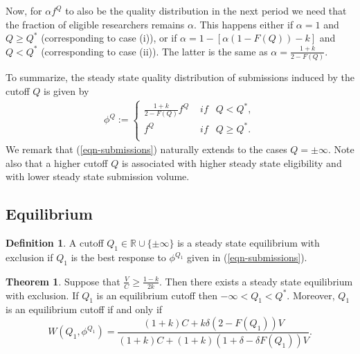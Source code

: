 \documentclass[12pt]{article}
\theoremstyle{plain}
\theoremstyle{definition}
\newtheorem{theorem}{Theorem}
\newtheorem{definition}{Definition}
\theoremstyle{remark}
\def\RR{\mathbb{R}}
\begin{document}
Now, for $\alpha f^Q$ to also be the quality distribution in the next period we need that the fraction of eligible researchers remains $\alpha$. This happens either if $\alpha=1$ and $Q\ge Q^*$ (corresponding to case (i)), or if $\alpha=1-[\alpha(1-F(Q))- k]$ and $Q< Q^*$ (corresponding to case (ii)). The latter is the same as $\alpha=\frac{1+k}{2-F(Q)}$.

To summarize, the steady state quality distribution of submissions induced by the cutoff $Q$ is given by 
\begin{eqnarray}\label{eqn-submissions}
\phi^Q :=
\left\{ \begin{array}{ll}
\frac{1+k}{2-F(Q)}f^Q & \textit{ if } ~~ Q <Q^*,\\
f^Q & \textit{ if } ~~Q \ge Q^*.\\
\end{array} \right.
\end{eqnarray}
We remark that (\ref{eqn-submissions}) naturally extends to the cases $Q=\pm \infty$. Note also that a higher cutoff $Q$ is associated with higher steady state eligibility and with lower steady state submission volume. 


\subsection{Equilibrium}

\begin{definition}\label{def-eq-with-bans}
A cutoff $Q_1\in \RR \cup \{\pm \infty\}$ is a steady state equilibrium with exclusion if $Q_1$ is the best response to $\phi^{Q_1}$ given in (\ref{eqn-submissions}).
\end{definition}

\begin{theorem}\label{thm-steady-state}
    Suppose that $\frac{V}{C}\ge \frac{1-k}{2k}$. Then there exists a steady state equilibrium with exclusion. If $Q_1$ is an equilibrium cutoff then $-\infty<Q_1<Q^*$. Moreover, $Q_1$ is an equilibrium cutoff if and only if
    \begin{equation}\label{eqn-steady-state-eq}
    W(Q_1,\phi^{Q_1})= \frac{(1+k)C+k\delta (2-F(Q_1))V}{(1+k)C+(1+k)(1+\delta -\delta F(Q_1))V}.
    \end{equation}
\end{theorem}
\end{document}
